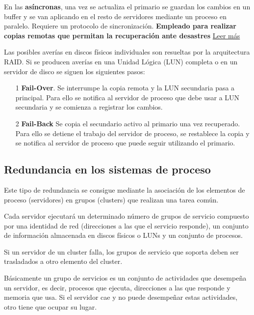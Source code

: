 En las \textbf{asíncronas}, una vez se actualiza el primario se guardan los cambios en un buffer y se van aplicando en el resto de servidores mediante un proceso en paralelo. Requiere un protocolo de sincronización. \textbf{Empleado para realizar copias remotas que permitan la recuperación ante desastres} \href{http://searchdatacenter.techtarget.com/es/consejo/Ventajas-e-inconvenientes-de-la-replicacion-remota-en-la-recuperacion-de-desastres}{Leer más}

Las posibles averías en discos físicos individuales son resueltas por la arquitectura RAID. Si se producen averías en una Unidad Lógica (LUN) completa o en un servidor de disco se siguen los siguientes pasos:
\begin{enumerate}
\item[1] \textbf{Fail-Over}. Se interrumpe la copia remota y la LUN secundaria pasa a principal. Para ello se notifica al servidor de proceso que debe usar a LUN secundaria y se comienza a registrar los cambios.

\item[2] \textbf{Fail-Back} Se copia el secundario activo al primario una vez recuperado. Para ello se detiene el trabajo del servidor de proceso, se restablece la copia y se notifica al servidor de proceso que puede seguir utilizando el primario.
\end{enumerate}


\subsection{Redundancia en los sistemas de proceso}
Este tipo de redundancia se consigue mediante la asociación de los elementos de proceso (servidores) en grupos (clusters) que realizan una tarea común.

Cada servidor ejecutará un determinado número de grupos de servicio compuesto por una identidad de red (direcciones a las que el servicio responde), un conjunto de información almacenada en discos físicos o LUNs y un conjunto de procesos.

Si un servidor de un cluster falla, los grupos de servicio que soporta deben ser trasladados a otro elemento del cluster.

Básicamente un grupo de servicios es un conjunto de actividades que desempeña un servidor, es decir, procesos que ejecuta, direcciones a las que responde y memoria que usa. Si el servidor cae y no puede desempeñar estas actividades, otro tiene que ocupar su lugar.


